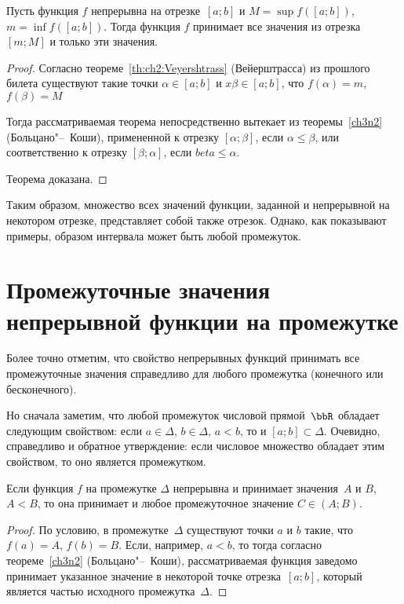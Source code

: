 \begin{thm}
Пусть функция $f$ непрерывна на отрезке~$[a;b]$ и $M=\sup f([a;b]) $, $m=\inf f([a;b])$. Тогда функция $f$ принимает все значения из отрезка $[m;M]$ и только эти значения.
\end{thm}
\begin{proof}
Согласно теореме~\ref{th:ch2:Veyershtrass} (Вейерштрасса) из прошлого билета существуют такие точки $\alpha\in [a;b]$ и $x\beta\in [a;b]$, что $f(\alpha)=m$, $f(\beta)=M$

Тогда рассматриваемая теорема непосредственно вытекает из теоремы~\ref{ch3n2} (Больцано"--~Коши), примененной к отрезку $[\alpha;\beta]$, если $\alpha \le \beta$, или соответственно к отрезку $[\beta;\alpha]$, если $beta \le \alpha$. 

Теорема доказана.
\end{proof} 

Таким образом, множество всех значений функции, заданной и непрерывной на некотором отрезке, представляет собой также отрезок. Однако, как показывают примеры, образом интервала может быть любой промежуток.

\section{Промежуточные значения непрерывной функции на промежутке}

Более точно отметим, что свойство непрерывных функций принимать все промежуточные значения справедливо для любого промежутка (конечного или бесконечного).

Но сначала заметим, что любой промежуток числовой прямой~$\bbR$ обладает следующим свойством: если $a\in\Delta$, $b\in\Delta$, $a<b$, то и $[a;b] \subset \Delta$. Очевидно, справедливо и обратное утверждение: если числовое множество обладает этим свойством, то оно является промежутком.

\begin{thm}
Если функция $f$ на промежутке $\Delta$ непрерывна и принимает значения~$A$ и $B$, $A<B$,  то она принимает и любое промежуточное значение $C\in (A;B)$.
\end{thm}
\begin{proof}
По условию, в промежутке~$\Delta$ существуют точки $a$ и $b$ такие, что $f(a) = A$, $f(b) = B$. Если, например, $a<b$, то тогда согласно теореме~\ref{ch3n2} (Больцано"--~Коши), рассматриваемая функция заведомо принимает указанное значение в некоторой точке отрезка~$[a;b]$, который является частью исходного промежутка~$\Delta$.
\end{proof} 

